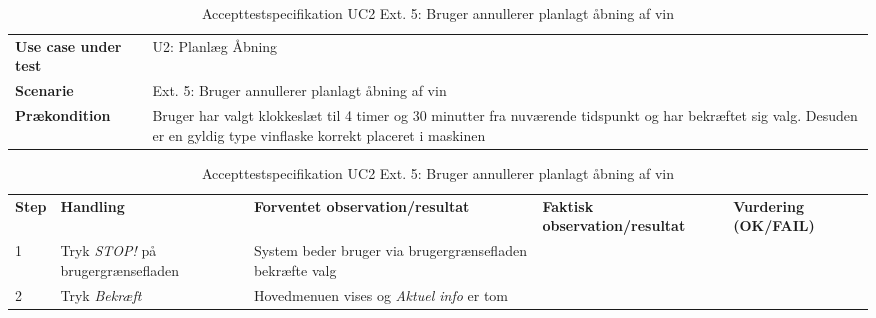 \begin{table}[H]
	\centering
	\caption{Accepttestspecifikation UC2 Ext. 5: Bruger annullerer planlagt åbning af vin}
	\label{ATUC2:Ext2}
	\begin{tabular}{ p{80pt}  p{320pt} }\hline
		\rowcolor{lightgray}	
		\textbf{Use case under test} & U2: Planlæg Åbning \\
		\rowcolor{white}
		\textbf{Scenarie} & Ext. 5: Bruger annullerer planlagt åbning af vin \\\rowcolor{lightgray}	
		\textbf{Prækondition} &
		Bruger har valgt klokkeslæt til 4 timer og 30 minutter fra nuværende tidspunkt og har bekræftet sig valg. Desuden er en gyldig type vinflaske korrekt placeret i maskinen \\
		\hline
	\end{tabular}
	\begin{tabular}{  p{26pt} p{100pt}  p{101pt} | p{67pt} | p{68pt}}
		\textbf{Step} & \textbf{Handling} & \textbf{Forventet observation/resultat} & \textbf{Faktisk observation/resultat} & \textbf{Vurdering (OK/FAIL)}\\
		1 & Tryk \emph{STOP!} på brugergrænsefladen & System beder bruger via brugergrænsefladen bekræfte valg
 &  &  \\
 		2 & Tryk \emph{Bekræft} & Hovedmenuen vises og \emph{Aktuel info} er tom \\
		\hline
	\end{tabular}
\end{table}